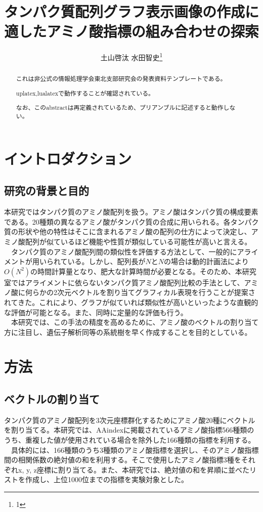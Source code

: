 \documentclass[twocolumn,paper=a4paper,landscape,fontsize=9pt]{jlreq}
\title{タンパク質配列グラフ表示画像の作成に適したアミノ酸指標の組み合わせの探索}
\author{土山啓汰 水田智史\thanks{1}}
\begin{document}

\maketitle

\begin{abstract}
  これは非公式の情報処理学会東北支部研究会の発表資料テンプレートである。

  uplatex,lualatexで動作することが確認されている。

  なお、このabstractは再定義されているため、プリアンブルに記述すると動作しない。
\end{abstract}

\section{イントロダクション}
\subsection{研究の背景と目的}
本研究ではタンパク質のアミノ酸配列を扱う。アミノ酸はタンパク質の構成要素である。20種類の異なるアミノ酸がタンパク質の合成に用いられる。各タンパク質の形状や他の特性はそこに含まれるアミノ酸の配列の仕方によって決定し、アミノ酸配列が似ているほど機能や性質が類似している可能性が高いと言える。 \\
　タンパク質のアミノ酸配列間の類似性を評価する方法として、一般的にアライメントが用いられている。しかし、配列長が$N$と$N$の場合は動的計画法により$O(N^2)$の時間計算量となり、肥大な計算時間が必要となる。そのため、本研究室ではアライメントに依らないタンパク質アミノ酸配列比較の手法として、アミノ酸に何らかの2次元ベクトルを割り当てグラフィカル表現を行うことが提案されてきた。これにより、グラフが似ていれば類似性が高いといったような直観的な評価が可能となる。また、同時に定量的な評価も行う。\\
　本研究では、この手法の精度を高めるために、アミノ酸のベクトルの割り当て方に注目し、遺伝子解析同等の系統樹を早く作成することを目的としている。


\section{方法}
\subsection{ベクトルの割り当て}
タンパク質のアミノ酸配列を3次元座標群化するためにアミノ酸20種にベクトルを割り当てる。本研究では、AAindexに掲載されているアミノ酸指標566種類のうち、重複した値が使用されている場合を除外した166種類の指標を利用する。
　具体的には、166種類のうち3種類のアミノ酸指標を選択し、そのアミノ酸指標間の相関係数の絶対値の和を利用する。そこで使用したアミノ酸指標3種をそれぞれx, y, z座標に割り当てる。また、本研究では、絶対値の和を昇順に並べたリストを作成し、上位1000位までの指標を実験対象とした。
\end{document}
